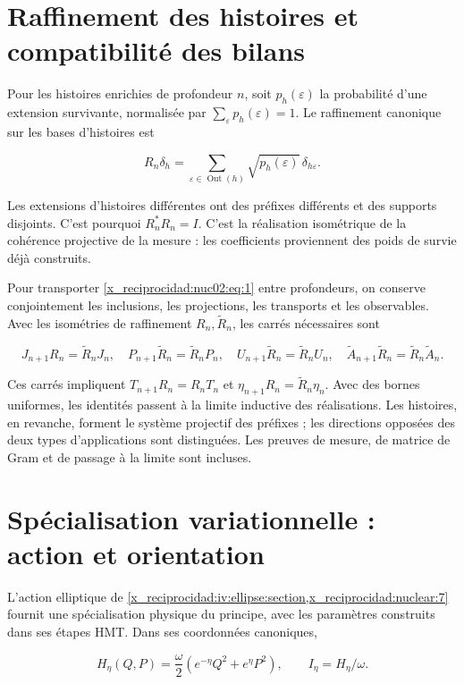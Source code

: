 \section{Raffinement des histoires et compatibilité des bilans}

Pour les histoires enrichies de profondeur \(n\), soit \(p_h(\varepsilon)\) la probabilité d’une extension survivante, normalisée par \(\sum_\varepsilon p_h(\varepsilon)=1\). Le raffinement canonique sur les bases d’histoires est

\[
R_n\delta_h=\sum_{\varepsilon\in\operatorname{Out}(h)}
\sqrt{p_h(\varepsilon)}\,\delta_{h\varepsilon}.
\]

Les extensions d’histoires différentes ont des préfixes différents et des supports disjoints. C’est pourquoi \(R_n^*R_n=I\). C’est la réalisation isométrique de la cohérence projective de la mesure : les coefficients proviennent des poids de survie déjà construits.

Pour transporter \eqref{x_reciprocidad:nuc02:eq:1} entre profondeurs, on conserve conjointement les inclusions, les projections, les transports et les observables. Avec les isométries de raffinement \(R_n,\widetilde R_n\), les carrés nécessaires sont

\[
J_{n+1}R_n=\widetilde R_nJ_n,\quad
P_{n+1}\widetilde R_n=\widetilde R_nP_n,\quad
U_{n+1}\widetilde R_n=\widetilde R_nU_n,\quad
\widetilde A_{n+1}\widetilde R_n=\widetilde R_n\widetilde A_n.
\]

Ces carrés impliquent \(T_{n+1}R_n=R_nT_n\) et \(\eta_{n+1}R_n=\widetilde R_n\eta_n\). Avec des bornes uniformes, les identités passent à la limite inductive des réalisations. Les histoires, en revanche, forment le système projectif des préfixes ; les directions opposées des deux types d’applications sont distinguées. Les preuves de mesure, de matrice de Gram et de passage à la limite sont incluses.

\section{Spécialisation variationnelle : action et orientation}

L’action elliptique de \cref{x_reciprocidad:iv:ellipse:section,x_reciprocidad:nuclear:7} fournit une spécialisation physique du principe, avec les paramètres construits dans ses étapes HMT. Dans ses coordonnées canoniques,

\[
H_\eta(Q,P)=\frac{\omega}{2}
\left(e^{-\eta}Q^2+e^\eta P^2\right),\qquad
I_\eta=H_\eta/\omega.
\]

